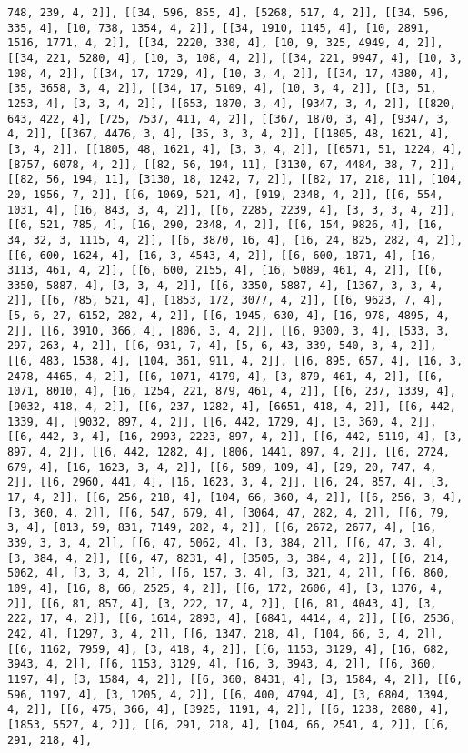 \documentclass[12pt,fleqn]{article}\usepackage{../../common}
\begin{document}
\begin{verbatim}
748, 239, 4, 2]], [[34, 596, 855, 4], [5268, 517, 4, 2]], [[34, 596, 335, 4], [10, 738, 1354, 4, 2]], [[34, 1910, 1145, 4], [10, 2891, 1516, 1771, 4, 2]], [[34, 2220, 330, 4], [10, 9, 325, 4949, 4, 2]], [[34, 221, 5280, 4], [10, 3, 108, 4, 2]], [[34, 221, 9947, 4], [10, 3, 108, 4, 2]], [[34, 17, 1729, 4], [10, 3, 4, 2]], [[34, 17, 4380, 4], [35, 3658, 3, 4, 2]], [[34, 17, 5109, 4], [10, 3, 4, 2]], [[3, 51, 1253, 4], [3, 3, 4, 2]], [[653, 1870, 3, 4], [9347, 3, 4, 2]], [[820, 643, 422, 4], [725, 7537, 411, 4, 2]], [[367, 1870, 3, 4], [9347, 3, 4, 2]], [[367, 4476, 3, 4], [35, 3, 3, 4, 2]], [[1805, 48, 1621, 4], [3, 4, 2]], [[1805, 48, 1621, 4], [3, 3, 4, 2]], [[6571, 51, 1224, 4], [8757, 6078, 4, 2]], [[82, 56, 194, 11], [3130, 67, 4484, 38, 7, 2]], [[82, 56, 194, 11], [3130, 18, 1242, 7, 2]], [[82, 17, 218, 11], [104, 20, 1956, 7, 2]], [[6, 1069, 521, 4], [919, 2348, 4, 2]], [[6, 554, 1031, 4], [16, 843, 3, 4, 2]], [[6, 2285, 2239, 4], [3, 3, 3, 4, 2]], [[6, 521, 785, 4], [16, 290, 2348, 4, 2]], [[6, 154, 9826, 4], [16, 34, 32, 3, 1115, 4, 2]], [[6, 3870, 16, 4], [16, 24, 825, 282, 4, 2]], [[6, 600, 1624, 4], [16, 3, 4543, 4, 2]], [[6, 600, 1871, 4], [16, 3113, 461, 4, 2]], [[6, 600, 2155, 4], [16, 5089, 461, 4, 2]], [[6, 3350, 5887, 4], [3, 3, 4, 2]], [[6, 3350, 5887, 4], [1367, 3, 3, 4, 2]], [[6, 785, 521, 4], [1853, 172, 3077, 4, 2]], [[6, 9623, 7, 4], [5, 6, 27, 6152, 282, 4, 2]], [[6, 1945, 630, 4], [16, 978, 4895, 4, 2]], [[6, 3910, 366, 4], [806, 3, 4, 2]], [[6, 9300, 3, 4], [533, 3, 297, 263, 4, 2]], [[6, 931, 7, 4], [5, 6, 43, 339, 540, 3, 4, 2]], [[6, 483, 1538, 4], [104, 361, 911, 4, 2]], [[6, 895, 657, 4], [16, 3, 2478, 4465, 4, 2]], [[6, 1071, 4179, 4], [3, 879, 461, 4, 2]], [[6, 1071, 8010, 4], [16, 1254, 221, 879, 461, 4, 2]], [[6, 237, 1339, 4], [9032, 418, 4, 2]], [[6, 237, 1282, 4], [6651, 418, 4, 2]], [[6, 442, 1339, 4], [9032, 897, 4, 2]], [[6, 442, 1729, 4], [3, 360, 4, 2]], [[6, 442, 3, 4], [16, 2993, 2223, 897, 4, 2]], [[6, 442, 5119, 4], [3, 897, 4, 2]], [[6, 442, 1282, 4], [806, 1441, 897, 4, 2]], [[6, 2724, 679, 4], [16, 1623, 3, 4, 2]], [[6, 589, 109, 4], [29, 20, 747, 4, 2]], [[6, 2960, 441, 4], [16, 1623, 3, 4, 2]], [[6, 24, 857, 4], [3, 17, 4, 2]], [[6, 256, 218, 4], [104, 66, 360, 4, 2]], [[6, 256, 3, 4], [3, 360, 4, 2]], [[6, 547, 679, 4], [3064, 47, 282, 4, 2]], [[6, 79, 3, 4], [813, 59, 831, 7149, 282, 4, 2]], [[6, 2672, 2677, 4], [16, 339, 3, 3, 4, 2]], [[6, 47, 5062, 4], [3, 384, 2]], [[6, 47, 3, 4], [3, 384, 4, 2]], [[6, 47, 8231, 4], [3505, 3, 384, 4, 2]], [[6, 214, 5062, 4], [3, 3, 4, 2]], [[6, 157, 3, 4], [3, 321, 4, 2]], [[6, 860, 109, 4], [16, 8, 66, 2525, 4, 2]], [[6, 172, 2606, 4], [3, 1376, 4, 2]], [[6, 81, 857, 4], [3, 222, 17, 4, 2]], [[6, 81, 4043, 4], [3, 222, 17, 4, 2]], [[6, 1614, 2893, 4], [6841, 4414, 4, 2]], [[6, 2536, 242, 4], [1297, 3, 4, 2]], [[6, 1347, 218, 4], [104, 66, 3, 4, 2]], [[6, 1162, 7959, 4], [3, 418, 4, 2]], [[6, 1153, 3129, 4], [16, 682, 3943, 4, 2]], [[6, 1153, 3129, 4], [16, 3, 3943, 4, 2]], [[6, 360, 1197, 4], [3, 1584, 4, 2]], [[6, 360, 8431, 4], [3, 1584, 4, 2]], [[6, 596, 1197, 4], [3, 1205, 4, 2]], [[6, 400, 4794, 4], [3, 6804, 1394, 4, 2]], [[6, 475, 366, 4], [3925, 1191, 4, 2]], [[6, 1238, 2080, 4], [1853, 5527, 4, 2]], [[6, 291, 218, 4], [104, 66, 2541, 4, 2]], [[6, 291, 218, 4], 
\end{verbatim}
\end{document}
